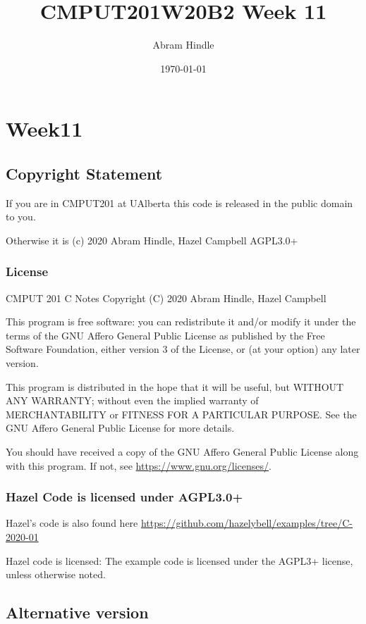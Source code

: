 \documentclass[11pt]{article}
\author{Abram Hindle}
\date{\today}
\title{CMPUT201W20B2 Week 11}
\begin{document}
\maketitle
\tableofcontents


\section{Week11}
\label{sec:org0b5c663}
\subsection{Copyright Statement}
\label{sec:orgceec8e9}

If you are in CMPUT201 at UAlberta this code is released in the public
domain to you.

Otherwise it is (c) 2020 Abram Hindle, Hazel Campbell AGPL3.0+

\subsubsection{License}
\label{sec:org73d3a11}

CMPUT 201 C Notes
Copyright (C) 2020 Abram Hindle, Hazel Campbell

This program is free software: you can redistribute it and/or modify
it under the terms of the GNU Affero General Public License as
published by the Free Software Foundation, either version 3 of the
License, or (at your option) any later version.

This program is distributed in the hope that it will be useful,
but WITHOUT ANY WARRANTY; without even the implied warranty of
MERCHANTABILITY or FITNESS FOR A PARTICULAR PURPOSE.  See the
GNU Affero General Public License for more details.

You should have received a copy of the GNU Affero General Public License
along with this program.  If not, see \url{https://www.gnu.org/licenses/}.


\subsubsection{Hazel Code is licensed under AGPL3.0+}
\label{sec:org17e5bc5}

Hazel's code is also found here
\url{https://github.com/hazelybell/examples/tree/C-2020-01}

Hazel code is licensed: The example code is licensed under the AGPL3+
license, unless otherwise noted.

\subsection{Alternative version}
\label{sec:org64a4906}
\end{document}
